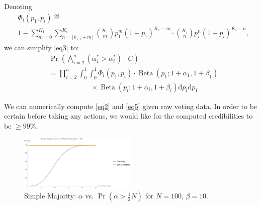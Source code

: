 \documentclass{sigchi}
\begin{document}
Denoting
\begin{align}\label{eq4}
& \Phi_i(p_1,p_i) {\overset {\underset {\mathrm {def} }{}}{=}} \nonumber\\
& 1 - \sum\limits_{m=0}^{K_1} \sum\limits_{n=\lceil{v_{1,i}+m}\rceil}^{K_i} {K_1 \choose m} p_1^{m} {(1-p_1)}^{K_1 - m} \cdot {K_i \choose n} p_i^{n} {(1-p_i)}^{K_i-n},
\end{align}
we can simplify \eqref{eq3} to:
\begin{align}\label{eq5}
& \Pr\left(\bigwedge_{i=2}^n (\alpha^*_1 > \alpha^*_i) \mid C\right)\nonumber\\
&= \prod_{i=2}^n \int_0^1 \int_0^1 \Phi_i(p_1,p_i) \cdot \operatorname{Beta}(p_1; 1+\alpha_1,1+\beta_1) \nonumber\\
& \qquad\qquad\qquad \times \operatorname{Beta}(p_i; 1+\alpha_i,1+\beta_i) \mathrm{d}p_i \mathrm{d}p_1
\end{align}

We can numerically compute \eqref{eq2} and \eqref{eq5} given raw voting data.
In order to be certain before taking any actions, we would like for the computed credibilities to be $\geq 99\%$.

\begin{figure}[ht]
\centering
\includegraphics[width=0.5\textwidth]{figures/simple_majority}
\caption{Simple Majority: $\alpha$ vs. $\Pr(\alpha > \frac{1}{2}N)$ for $N=100$, $\beta = 10$.}
\label{simple_majority}
\end{figure}
\end{document}

